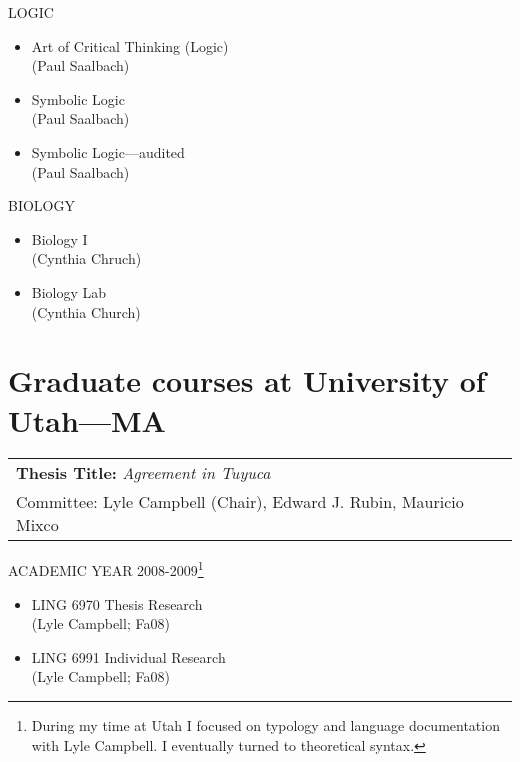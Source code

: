 \documentclass[11pt,twosided]{article}
\theoremstyle{plain}
\theoremstyle{definition}
\newtheorem{phrase string}{Phrase String}
\begin{document}
\noindent LOGIC 
\begin{itemize}
\item Art of Critical Thinking (Logic)\\
(Paul Saalbach)
\item Symbolic Logic\\
(Paul Saalbach)
\item Symbolic Logic---audited\\
(Paul Saalbach) 
\end{itemize}

\noindent BIOLOGY
\begin{itemize}
\item Biology I\\
(Cynthia Chruch)
\item Biology Lab\\
(Cynthia Church)
\end{itemize}

\section{Graduate courses at University of Utah---MA}

\begin{tabular}{|p{12cm}|} 
\hline
\textbf{Thesis Title:} \textsl{Agreement in Tuyuca}\\
Committee: Lyle Campbell (Chair), Edward J. Rubin, Mauricio Mixco\\
\hline
\end{tabular}
\newline
\newline
 
 
\noindent ACADEMIC YEAR 2008-2009\footnote {During my time at Utah I focused on typology and language documentation with Lyle Campbell. I eventually turned to theoretical syntax.}
\begin{itemize}
\item LING 6970 Thesis Research\\
(Lyle Campbell; Fa08)
\item LING 6991 Individual Research\\
(Lyle Campbell; Fa08)
\end{itemize}
\end{document}
